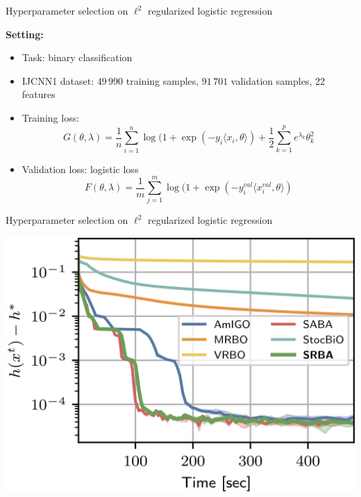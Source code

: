 \documentclass{beamer}
\begin{document}
\begin{frame}{Hyperparameter selection on $\ell^2$ regularized logistic regression}

    \textbf{Setting: }
    \begin{itemize}
        \item Task: binary classification

        \item IJCNN1 dataset: $49\,990$ training samples, $91\,701$ validation samples, 22 features

        \item Training loss:
           $$G(\theta, \lambda) = \frac1n\sum_{i=1}^n \log(1+\exp(-y_i\langle x_i, \theta\rangle) + \frac12\sum_{k=1}^p e^{\lambda_k}\theta_k^2$$

        \item Validation loss: logistic loss
        $$
        F(\theta, \lambda) = \frac1m\sum_{j=1}^m \log(1+\exp(-y_i^{val}\langle x_i^{val}, \theta\rangle)
        $$
    \end{itemize}

\end{frame}

\begin{frame}{Hyperparameter selection on $\ell^2$ regularized logistic regression}

    \centering
    \includegraphics[width=.8\textwidth]{images/SRBA}\\

\end{frame}


\end{document}
